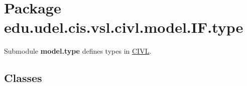 \hypertarget{namespaceedu_1_1udel_1_1cis_1_1vsl_1_1civl_1_1model_1_1IF_1_1type}{}\section{Package edu.\+udel.\+cis.\+vsl.\+civl.\+model.\+I\+F.\+type}
\label{namespaceedu_1_1udel_1_1cis_1_1vsl_1_1civl_1_1model_1_1IF_1_1type}


Submodule {\bfseries model.\+type} defines types in \hyperlink{classedu_1_1udel_1_1cis_1_1vsl_1_1civl_1_1CIVL}{C\+I\+V\+L}.  


\subsection*{Classes}
